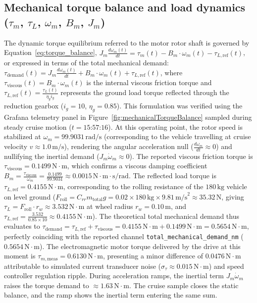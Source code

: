 \subsection{Mechanical torque balance and load dynamics (\texorpdfstring{$\tau_m$, $\tau_L$, $\omega_m$, $B_m$, $J_m$}{tau\_m, tau\_L, wm, Bm, Jm})}
The dynamic torque equilibrium referred to the motor rotor shaft is governed by Equation~\eqref{eq:torque_balance}, $J_m \frac{d\omega_m(t)}{dt} = \tau_m(t) - B_m \cdot \omega_m(t) - \tau_{L,\text{ref}}(t)$, or expressed in terms of the total mechanical demand: $\tau_{\text{demand}}(t) = J_m \frac{d\omega_m(t)}{dt} + B_m \cdot \omega_m(t) + \tau_{L,\text{ref}}(t)$, where $\tau_{\text{viscous}}(t) = B_m \cdot \omega_m(t)$ is the internal viscous friction torque and $\tau_{L,\text{ref}}(t) = \frac{\tau_L(t)}{\eta_g i_g}$ represents the ground load torque reflected through the reduction gearbox ($i_g = 10$, $\eta_g = 0.85$). This formulation was verified using the Grafana telemetry panel in Figure~\ref{fig:mechanicalTorqueBalance} sampled during steady cruise motion ($t = \text{15:57:16}$). At this operating point, the rotor speed is stabilized at $\omega_m = 99.9031\,\text{rad/s}$ (corresponding to the vehicle travelling at cruise velocity $v \approx 1.0\,\text{m/s}$), rendering the angular acceleration null ($\frac{d\omega_m}{dt} \approx 0$) and nullifying the inertial demand ($J_m \dot{\omega}_m \approx 0$). The reported viscous friction torque is $\tau_{\text{viscous}} = 0.1499\,\text{N}\cdot\text{m}$, which confirms a viscous damping coefficient $B_m = \frac{\tau_{\text{viscous}}}{\omega_m} = \frac{0.1499}{99.9031} \approx 0.0015\,\text{N}\cdot\text{m}\cdot\text{s/rad}$. The reflected load torque is $\tau_{L,\text{ref}} = 0.4155\,\text{N}\cdot\text{m}$, corresponding to the rolling resistance of the $180\,\text{kg}$ vehicle on level ground ($F_{\text{roll}} = C_{rr} m_{\text{total}} g = 0.02 \times 180\,\text{kg} \times 9.81\,\text{m/s}^2 \approx 35.32\,\text{N}$, giving $\tau_L = F_{\text{roll}} \cdot r_w \approx 3.532\,\text{N}\cdot\text{m}$ at wheel radius $r_w = 0.10\,\text{m}$, and $\tau_{L,\text{ref}} = \frac{3.532}{0.85 \times 10} \approx 0.4155\,\text{N}\cdot\text{m}$). The theoretical total mechanical demand thus evaluates to $\tau_{\text{demand}} = \tau_{L,\text{ref}} + \tau_{\text{viscous}} = 0.4155\,\text{N}\cdot\text{m} + 0.1499\,\text{N}\cdot\text{m} = 0.5654\,\text{N}\cdot\text{m}$, perfectly coinciding with the reported channel \texttt{total\_mechanical\_demand\_nm} ($0.5654\,\text{N}\cdot\text{m}$). The electromagnetic motor torque delivered by the drive at this moment is $\tau_{m,\text{meas}} = 0.6130\,\text{N}\cdot\text{m}$, presenting a minor difference of $0.0476\,\text{N}\cdot\text{m}$ attributable to simulated current transducer noise ($\sigma_\tau \approx 0.015\,\text{N}\cdot\text{m}$) and speed controller regulation ripple. During acceleration ramps, the inertial term $J_m\dot{\omega}_m$ raises the torque demand to $\approx 1.63\,\text{N}\cdot\text{m}$. The cruise sample closes the static balance, and the ramp shows the inertial term entering the same sum.

